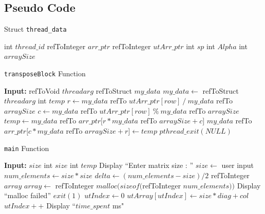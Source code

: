 \documentclass[10pt, conference]{IEEEtran}
\def\code#1{\texttt{#1}}
\begin{document}
\onecolumn
\begin{appendices}
\section{Pseudo Code}
\label{Pseudo Appendix}

\begin{algorithm}[h!]
\caption{Struct \code{thread\_data}}
\label{Struct}
\begin{algorithmic} 

\STATE int $thread\_id$
\STATE refToInteger $arr\_ptr$
\STATE refToInteger $utArr\_ptr$
\STATE int $sp$
\STATE int $Alpha$
\STATE int $arraySize$

\end{algorithmic}
\end{algorithm}


\begin{algorithm}[h!]
\caption{\code{transposeBlock} Function}
\label{transposeBlock}
\begin{algorithmic} 
\STATE \textbf{Input:} refToVoid $threadarg$
\STATE
\STATE refToStruct $my\_data$
\STATE $my\_data \leftarrow$ refToStruct $threadarg$
\STATE int $temp$
\STATE
{}
	\STATE $r \leftarrow my\_data$ refTo $utArr\_ptr[row]~ / ~my\_data$ refTo $arraySize$
	\STATE $c \leftarrow my\_data$ refTo $utArr\_ptr[row]~ \% ~my\_data$ refTo $arraySize$
	\STATE $temp \leftarrow my\_data$ refTo $arr\_ptr[r*my\_data$ refTo $arraySize + c]$
	\STATE $my\_data$ refTo $arr\_ptr[c*my\_data$ refTo $arraySize + r] \leftarrow temp$
\ENDFOR
\STATE
\STATE $pthread\_exit(NULL)$

\end{algorithmic}
\end{algorithm}

\begin{algorithm}[h!]
\caption{\code{main} Function}
\label{main}
\begin{algorithmic} 
\STATE \textbf{Input:} $size$
\STATE
\STATE int $size$
\STATE int $temp$
\STATE Display ``Enter matrix size : ''
\STATE $size \leftarrow$ user input
\STATE $num\_elements \leftarrow size*size$
\STATE $delta \leftarrow (num\_elements - size)/2$
\STATE refToInteger $array$
\STATE $array \leftarrow$ refToInteger $malloc(sizeof($refToInteger $num\_elements))$
\STATE
{}
	\STATE Display ``malloc failed''
	\STATE $exit(1)$
\ENDIF
\STATE
\STATE $utIndex \leftarrow 0$
		\STATE $utArray[utIndex] \leftarrow size*diag + col$
		\STATE $utIndex++$
	\ENDFOR
\ENDFOR
\STATE
\STATE Display ``$time\_spent$ ms"


\end{algorithmic}
\end{algorithm}
\end{appendices}
\end{document}
